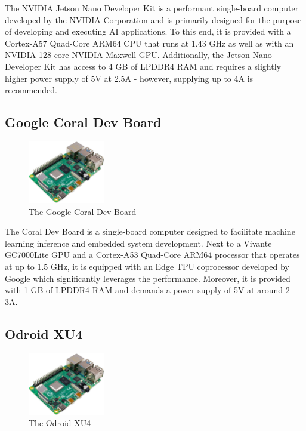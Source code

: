 The NVIDIA Jetson Nano Developer Kit is a performant single-board computer developed by the NVIDIA Corporation and is primarily designed for the purpose of developing and executing AI applications. To this end, it is provided with a Cortex-A57 Quad-Core ARM64 CPU that runs at 1.43 GHz as well as with an NVIDIA 128-core NVIDIA Maxwell GPU. Additionally, the Jetson Nano Developer Kit has access to 4 GB of LPDDR4 RAM and requires a slightly higher power supply of 5V at 2.5A - however, supplying up to 4A is recommended.~\parencite{jetson-nano-devkit-manual}

\subsection{Google Coral Dev Board}

\begin{figure}[h]
    \centering
    \includegraphics[width=0.30\textwidth]{./figures/mesh}
    \caption{The Google Coral Dev Board}
    \label{fig:coral-dev-board}
\end{figure}

The Coral Dev Board is a single-board computer designed to facilitate machine learning inference and embedded system development. Next to a Vivante GC7000Lite GPU and a Cortex-A53 Quad-Core ARM64 processor that operates at up to 1.5 GHz, it is equipped with an Edge TPU coprocessor developed by Google which significantly leverages the performance. Moreover, it is provided with 1 GB of LPDDR4 RAM and demands a power supply of 5V at around 2-3A.~\parencite{coral-dev-board-manual}

\subsection{Odroid XU4}

\begin{figure}[h]
    \centering
    \includegraphics[width=0.30\textwidth]{./figures/mesh}
    \caption{The Odroid XU4}
    \label{fig:odroid-xu4}
\end{figure}

